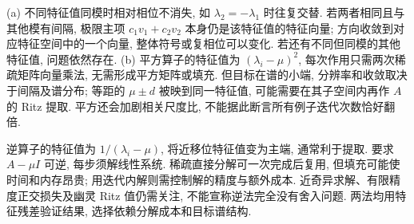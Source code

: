 \begin{solution}
(a) 不同特征值同模时相对相位不消失, 如 $\lambda_2=-\lambda_1$ 时往复交替. 若两者相同且与其他模有间隔, 极限主项 $c_1v_1+c_2v_2$ 本身仍是该特征值的特征向量; 方向收敛到对应特征空间中的一个向量, 整体符号或复相位可以变化. 若还有不同但同模的其他特征值, 问题依然存在.
(b) 平方算子的特征值为 $(\lambda_i-\mu)^2$, 每次作用只需两次稀疏矩阵向量乘法, 无需形成平方矩阵或填充. 但目标在谱的小端, 分辨率和收敛取决于间隔及谱分布; 等距的 $\mu\pm d$ 被映到同一特征值, 可能需要在其子空间内再作 $A$ 的 Ritz 提取. 平方还会加剧相关尺度比, 不能据此断言所有例子迭代次数恰好翻倍.

逆算子的特征值为 $1/(\lambda_i-\mu)$, 将近移位特征值变为主端, 通常利于提取. 要求 $A-\mu I$ 可逆, 每步须解线性系统. 稀疏直接分解可一次完成后复用, 但填充可能使时间和内存昂贵; 用迭代内解则需控制解的精度与额外成本. 近奇异求解、有限精度正交损失及幽灵 Ritz 值仍需关注, 不能宣称逆法完全没有舍入问题. 两法均用特征残差验证结果, 选择依赖分解成本和目标谱结构.
\end{solution}
